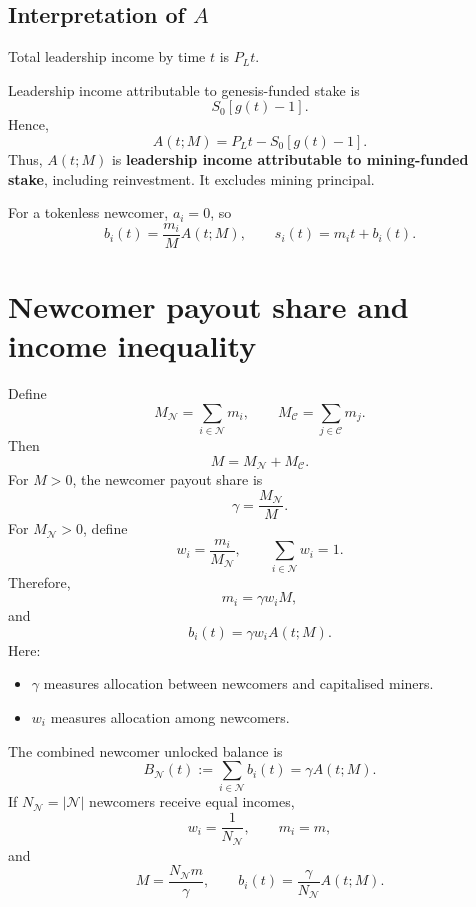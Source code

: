 \documentclass[11pt,a4paper]{article}
\begin{document}
\subsection*{Interpretation of $A$}
Total leadership income by time $t$ is $P_Lt$.

Leadership income attributable to genesis-funded stake is
\begin{equation}
S_0[g(t)-1].
\end{equation}
Hence,
\begin{equation}
A(t;M)=P_Lt-S_0[g(t)-1].
\end{equation}
Thus, $A(t;M)$ is \textbf{leadership income attributable to mining-funded stake}, including reinvestment. It excludes mining principal.

For a tokenless newcomer, $a_i=0$, so
\begin{equation}
\boxed{b_i(t)=\frac{m_i}{M}A(t;M),\qquad s_i(t)=m_it+b_i(t).}
\end{equation}

\section{Newcomer payout share and income inequality}
Define
\begin{equation}
M_{\mathcal N}=\sum_{i\in\mathcal N}m_i,\qquad M_{\mathcal C}=\sum_{j\in\mathcal C}m_j.
\end{equation}
Then
\begin{equation}
M=M_{\mathcal N}+M_{\mathcal C}.
\end{equation}
For $M>0$, the newcomer payout share is
\begin{equation}
\boxed{\gamma=\frac{M_{\mathcal N}}{M}.}
\end{equation}
For $M_{\mathcal N}>0$, define
\begin{equation}
w_i=\frac{m_i}{M_{\mathcal N}},\qquad\sum_{i\in\mathcal N}w_i=1.
\end{equation}
Therefore,
\begin{equation}
m_i=\gamma w_iM,
\end{equation}
and
\begin{equation}
\boxed{b_i(t)=\gamma w_iA(t;M).}
\end{equation}
Here:
\begin{itemize}
\item $\gamma$ measures allocation between newcomers and capitalised miners.
\item $w_i$ measures allocation among newcomers.
\end{itemize}
The combined newcomer unlocked balance is
\begin{equation}
\boxed{B_{\mathcal N}(t):=\sum_{i\in\mathcal N}b_i(t)=\gamma A(t;M).}
\end{equation}
If $N_{\mathcal N}=|\mathcal N|$ newcomers receive equal incomes,
\begin{equation}
w_i=\frac1{N_{\mathcal N}},\qquad m_i=m,
\end{equation}
and
\begin{equation}
\boxed{M=\frac{N_{\mathcal N}m}{\gamma},\qquad b_i(t)=\frac{\gamma}{N_{\mathcal N}}A(t;M).}
\end{equation}
\end{document}
